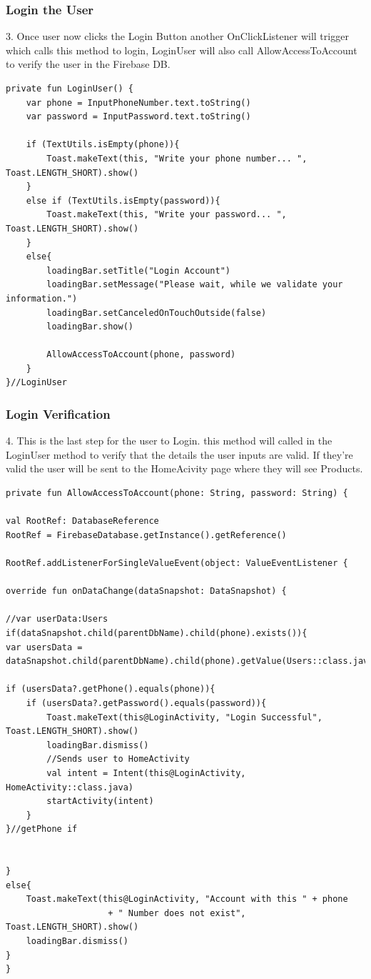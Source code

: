 \subsubsection{Login the User}
3. Once user now clicks the Login Button another OnClickListener will trigger which calls this method to login, LoginUser will also call AllowAccessToAccount to verify the user in the Firebase DB.
\begin{verbatim}
private fun LoginUser() {
    var phone = InputPhoneNumber.text.toString()
    var password = InputPassword.text.toString()

    if (TextUtils.isEmpty(phone)){
        Toast.makeText(this, "Write your phone number... ", Toast.LENGTH_SHORT).show()
    }
    else if (TextUtils.isEmpty(password)){
        Toast.makeText(this, "Write your password... ", Toast.LENGTH_SHORT).show()
    }
    else{
        loadingBar.setTitle("Login Account")
        loadingBar.setMessage("Please wait, while we validate your information.")
        loadingBar.setCanceledOnTouchOutside(false)
        loadingBar.show()
        
        AllowAccessToAccount(phone, password)
    }
}//LoginUser

\end{verbatim}
\newpage
\subsubsection{Login Verification}
4. This is the last step for the user to Login. this method will called in the LoginUser method to verify that the details the user inputs are valid. If they're valid the user will be sent to the HomeAcivity page where they will see Products.
\begin{verbatim}
private fun AllowAccessToAccount(phone: String, password: String) {

val RootRef: DatabaseReference
RootRef = FirebaseDatabase.getInstance().getReference()

RootRef.addListenerForSingleValueEvent(object: ValueEventListener {

override fun onDataChange(dataSnapshot: DataSnapshot) {

//var userData:Users
if(dataSnapshot.child(parentDbName).child(phone).exists()){
var usersData = dataSnapshot.child(parentDbName).child(phone).getValue(Users::class.java)

if (usersData?.getPhone().equals(phone)){
    if (usersData?.getPassword().equals(password)){
        Toast.makeText(this@LoginActivity, "Login Successful", Toast.LENGTH_SHORT).show()
        loadingBar.dismiss()
        //Sends user to HomeActivity
        val intent = Intent(this@LoginActivity, HomeActivity::class.java)
        startActivity(intent)
    }
}//getPhone if


}
else{
    Toast.makeText(this@LoginActivity, "Account with this " + phone
                    + " Number does not exist", Toast.LENGTH_SHORT).show()
    loadingBar.dismiss()
}
}
\end{verbatim}




